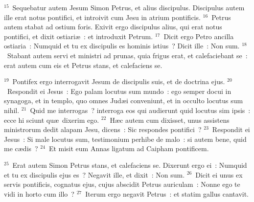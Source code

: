 ${}^{15}$~Sequebatur autem Jesum Simon Petrus, et alius discipulus. Discipulus autem ille erat notus pontifici, et introivit cum Jesu in atrium pontificis.
${}^{16}$~Petrus autem stabat ad ostium foris. Exivit ergo discipulus alius, qui erat notus pontifici, et dixit ostiari\ae~: et introduxit Petrum.
${}^{17}$~Dicit ergo Petro ancilla ostiaria~: Numquid et tu ex discipulis es hominis istius~? Dicit ille~: Non sum.
${}^{18}$~Stabant autem servi et ministri ad prunas, quia frigus erat, et calefaciebant se~: erat autem cum eis et Petrus stans, et calefaciens se.


${}^{19}$~Pontifex ergo interrogavit Jesum de discipulis suis, et de doctrina ejus.
${}^{20}$~Respondit ei Jesus~: Ego palam locutus sum mundo~: ego semper docui in synagoga, et in templo, quo omnes Jud\ae i conveniunt, et in occulto locutus sum nihil.
${}^{21}$~Quid me interrogas~? interroga eos qui audierunt quid locutus sim ipsis~: ecce hi sciunt qu\ae\ dixerim ego.
${}^{22}$~H\ae c autem cum dixisset, unus assistens ministrorum dedit alapam Jesu, dicens~: Sic respondes pontifici~?
${}^{23}$~Respondit ei Jesus~: Si male locutus sum, testimonium perhibe de malo~: si autem bene, quid me c\ae dis~?
${}^{24}$~Et misit eum Annas ligatum ad Caipham pontificem.


${}^{25}$~Erat autem Simon Petrus stans, et calefaciens se. Dixerunt ergo ei~: Numquid et tu ex discipulis ejus es~? Negavit ille, et dixit~: Non sum.
${}^{26}$~Dicit ei unus ex servis pontificis, cognatus ejus, cujus abscidit Petrus auriculam~: Nonne ego te vidi in horto cum illo~?
${}^{27}$~Iterum ergo negavit Petrus~: et statim gallus cantavit.


